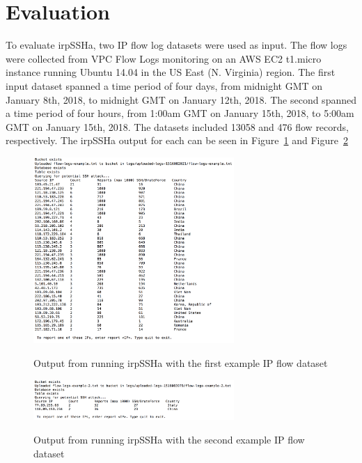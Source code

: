 \section{Evaluation}
To evaluate irpSSHa, two IP flow log datasets were used as input. The flow logs were collected from VPC Flow Logs monitoring on an AWS EC2 t1.micro instance running Ubuntu 14.04 in the US East (N. Virginia) region. The first input dataset spanned a time period of four days, from midnight GMT on January 8th, 2018, to midnight GMT on January 12th, 2018. The second spanned a time period of four hours, from 1:00am GMT on January 15th, 2018, to 5:00am GMT on January 15th, 2018. The datasets included 13058 and 476 flow records, respectively. The irpSSHa output for each can be seen in Figure~\ref{fig:output1} and Figure~\ref{fig:output2}

\begin{figure}[h]
{\includegraphics[width=3in]{./figures/561-irpSSHa-output-1.png}}
\caption{\small{Output from running irpSSHa with the first example IP flow dataset}}
\label{fig:output1}
\end{figure}

\begin{figure}[h]
{\includegraphics[width=3in]{./figures/561-irpSSHa-output-2.png}}
\caption{\small{Output from running irpSSHa with the second example IP flow dataset}}
\label{fig:output2}
\end{figure}

